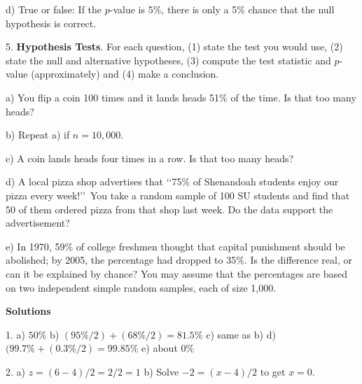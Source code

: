 \documentclass[10pt]{article}
\begin{document}
{\hspace{10pt} d) True or false: If the $p$-value is 5\%, there is only a 5\% chance that
the null hypothesis is correct.
\eject

5. \textbf{Hypothesis Tests}.
For each question,  (1) state the test you would use, (2) state the null and alternative hypotheses,
(3) compute the test statistic and $p$-value (approximately) and (4) make a conclusion.

\hspace{10pt} a)  You flip a coin 100 times and it lands heads 51\% of the time.  Is that too many heads?
\vspace{1.5in}

\hspace{10pt} b) Repeat a) if  $n=10,000$.  
\vspace{1.5in}

\hspace{10pt} c) A coin lands heads four times in a row.   Is that too many heads?
\vspace{1.5in}

\hspace{10pt} d)   A local pizza shop advertises that
\lq\lq 75\% of Shenandoah students enjoy our pizza every week!\rq\rq\
You take a  random sample of 100 SU students and find that 50 of them ordered 
 pizza from that shop last week.  Do the data support the advertisement?
\vspace{1.5in}

\hspace{10pt} e)
In 1970, 59\% of college freshmen thought that capital punishment
should be abolished;  by 2005, the percentage had dropped to 35\%.
Is the difference real, or can it be explained by chance? You may assume that
the percentages are based on two independent simple random samples, each of
size 1,000.
\vfill
\eject

\begin{center}
\textbf{\large Solutions}
\end{center}

{\small

1. a) $50\%$ \hspace{3pt}
   b) $(95\%/2) + (68\%/2) = 81.5\%$ \hspace{3pt}
   c) same as b) \hspace{3pt}
   d) $(99.7\% + (0.3\%/2) = 99.85\%$ \hspace{3pt}
   e) about 0\%

2. a) $z=(6-4)/2 = 2/2 = 1$\hspace{3pt} b) Solve $-2 = (x-4)/2$ to get $x=0$.

}}
\end{document}
